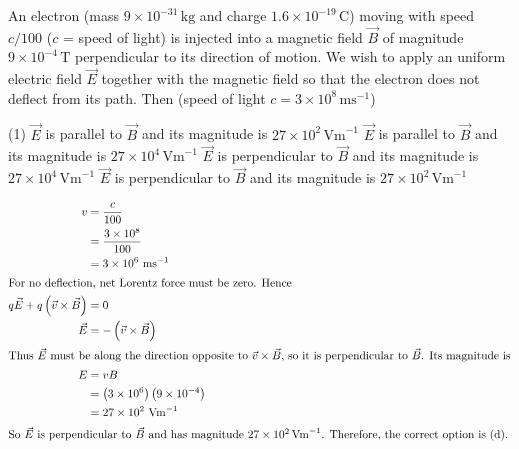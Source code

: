 

\item An electron (mass $9 \times 10^{-31}\,\mathrm{kg}$ and charge $1.6 \times 10^{-19}\,\mathrm{C}$) moving with speed $c/100$ ($c$ = speed of light) is injected into a magnetic field $\vec{B}$ of magnitude $9 \times 10^{-4}\,\mathrm{T}$ perpendicular to its direction of motion. We wish to apply an uniform electric field $\vec{E}$ together with the magnetic field so that the electron does not deflect from its path. Then (speed of light $c = 3 \times 10^8\,\mathrm{m s}^{-1}$)
\begin{tasks}(1)
    \task $\vec{E}$ is parallel to $\vec{B}$ and its magnitude is $27 \times 10^2\,\mathrm{V m}^{-1}$
    \task $\vec{E}$ is parallel to $\vec{B}$ and its magnitude is $27 \times 10^4\,\mathrm{V m}^{-1}$
    \task $\vec{E}$ is perpendicular to $\vec{B}$ and its magnitude is $27 \times 10^4\,\mathrm{V m}^{-1}$
    \task $\vec{E}$ is perpendicular to $\vec{B}$ and its magnitude is $27 \times 10^2\,\mathrm{V m}^{-1}$ \ans
\end{tasks}
\begin{solution}
\begin{align*}
v &= \frac{c}{100} \\
  &= \frac{3 \times 10^8}{100} \\
  &= 3 \times 10^6 \ \mathrm{m s}^{-1} \\
\intertext{For no deflection, net Lorentz force must be zero. Hence}
q\vec{E} + q\left( \vec{v} \times \vec{B} \right) &= 0 \\
\vec{E} &= -\left( \vec{v} \times \vec{B} \right) \\
\intertext{Thus $\vec{E}$ must be along the direction opposite to $\vec{v} \times \vec{B}$, so it is perpendicular to $\vec{B}$. Its magnitude is}
E &= v B \\
  &= \left( 3 \times 10^6 \right)\left( 9 \times 10^{-4} \right) \\
  &= 27 \times 10^2 \ \mathrm{V m}^{-1} \\
\intertext{So $\vec{E}$ is perpendicular to $\vec{B}$ and has magnitude $27 \times 10^2\,\mathrm{V m}^{-1}$. Therefore, the correct option is (d).}
\end{align*}
\end{solution}

